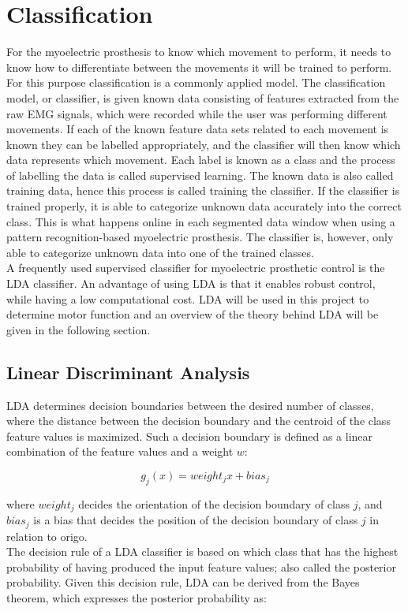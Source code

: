 \section{Classification}
For the myoelectric prosthesis to know which movement to perform, it needs to know how to differentiate between the movements it will be trained to perform. For this purpose classification is a commonly applied model. The classification model, or classifier, is given known data consisting of features extracted from the raw EMG signals, which were recorded while the user was performing different movements. If each of the known feature data sets related to each movement is known they can be labelled appropriately, and the classifier will then know which data represents which movement. Each label is known as a class and the process of labelling the data is called supervised learning. The known data is also called training data, hence this process is called training the classifier. If the classifier is trained properly, it is able to categorize unknown data accurately into the correct class. This is what happens online in each segmented data window when using a pattern recognition-based myoelectric prosthesis. The classifier is, however, only able to categorize unknown data into one of the trained classes. \\
A frequently used supervised classifier for myoelectric prosthetic control is the LDA classifier. An advantage of using LDA is that it enables robust control, while having a low computational cost. LDA will be used in this project to determine motor function and an overview of the theory behind LDA will be given in the following section.

\subsection{Linear Discriminant Analysis} 
LDA determines decision boundaries between the desired number of classes, where the distance between the decision boundary and the centroid of the class feature values is maximized. Such a decision boundary is defined as a linear combination of the feature values and a weight $w$:

\begin{equation} \label{eq:LDAcommon}
	g_{j}(x) = weight_{j}x + bias_{j}
\end{equation}

where $weight_{j}$ decides the orientation of the decision boundary of class $j$, and $bias_{j}$ is a bias that decides the position of the decision boundary of class $j$ in relation to origo. \\
The decision rule of a LDA classifier is based on which class that has the highest probability of having produced the input feature values; also called the posterior probability. Given this decision rule, LDA can be derived from the Bayes theorem, which expresses the posterior probability as:

